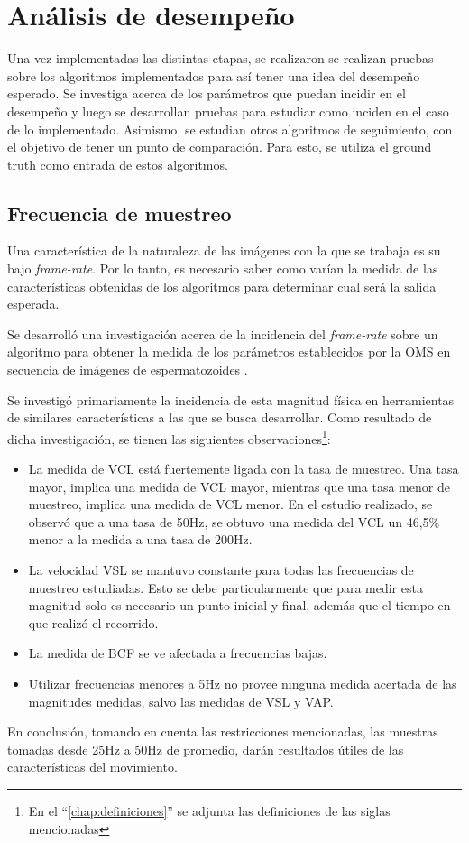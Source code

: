 \chapter{Análisis de desempeño}
Una vez implementadas las distintas etapas, se realizaron se realizan pruebas sobre los algoritmos implementados para así tener una idea del desempeño esperado. Se investiga acerca de los parámetros que puedan incidir en el desempeño y luego se desarrollan pruebas para estudiar como inciden en el caso de lo implementado. Asimismo, se estudian otros algoritmos de seguimiento, con el objetivo de tener un punto de comparación. Para esto, se utiliza el ground truth como entrada de estos algoritmos.

\section{Frecuencia de muestreo}
Una característica de la naturaleza de las imágenes con la que se trabaja es su bajo \textit{frame-rate}. Por lo tanto, es necesario saber como varían la medida de las características obtenidas de los algoritmos para determinar cual será la salida esperada.


Se desarrolló una investigación acerca de la incidencia del \textit{frame-rate} sobre un algoritmo para obtener la medida de los parámetros establecidos por la OMS en secuencia de imágenes de espermatozoides \cite{frecAn}. 

Se investigó primariamente la incidencia de esta magnitud física en herramientas de similares características a las que se busca desarrollar. Como resultado de dicha investigación, se tienen las siguientes observaciones\footnote{En el ``\autoref{chap:definiciones}'' se adjunta las definiciones de las siglas mencionadas}:
\begin{itemize}
    \item La medida de VCL está fuertemente ligada con la tasa de muestreo. Una tasa mayor, implica una medida de VCL mayor, mientras que una tasa menor de muestreo, implica una medida de VCL menor. En el estudio realizado, se observó que a una tasa de 50Hz, se obtuvo una medida del VCL un 46,5\% menor a la medida a una tasa de 200Hz. 
    \item La velocidad VSL se mantuvo constante para todas las frecuencias de muestreo estudiadas. Esto se debe particularmente que para medir esta magnitud solo es necesario un punto inicial y final, además que el tiempo en que realizó el recorrido. 
    \item La medida de BCF se ve afectada a frecuencias bajas.
    \item Utilizar frecuencias menores a 5Hz no provee ninguna medida acertada de las magnitudes medidas, salvo las medidas de VSL y VAP. 
\end{itemize}{}
En conclusión, tomando en cuenta las restricciones mencionadas, las muestras tomadas desde 25Hz a 50Hz de promedio, darán resultados útiles de las características del movimiento. 



